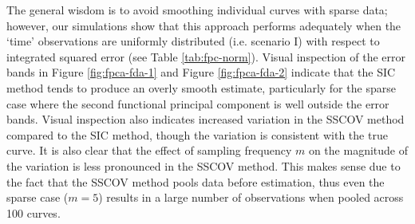 The general wisdom is to avoid smoothing individual curves with sparse data; however, our simulations show that this approach performs adequately when the `time' observations are uniformly distributed (i.e. scenario I) with respect to integrated squared error (see Table \ref{tab:fpc-norm}). Visual inspection of the error bands in Figure \ref{fig:fpca-fda-1} and Figure \ref{fig:fpca-fda-2} indicate that the SIC method tends to produce an overly smooth estimate, particularly for the sparse case where the second functional principal component is well outside the error bands. Visual inspection also indicates increased variation in the SSCOV method compared to the SIC method, though the variation is consistent with the true curve. It is also clear that the effect of sampling frequency $m$ on the magnitude of the variation is less pronounced in the SSCOV method. This makes sense due to the fact that the SSCOV method pools data before estimation, thus even the sparse case ($m = 5$) results in a large number of observations when pooled across 100 curves. 

